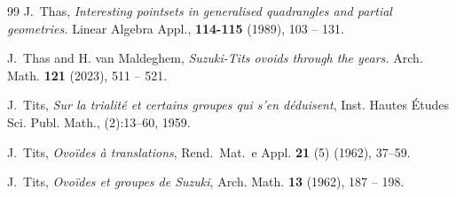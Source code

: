 \documentclass[a4paper,11pt]{amsproc}
\theoremstyle{plain}
\theoremstyle{definition}
\newcommand{\<}{\langle}
\renewcommand{\>}{\rangle} %
\begin{document}
\begin{thebibliography}{99}
J.~Thas,
{\it Interesting pointsets in generalised quadrangles and partial
  geometries.}
Linear Algebra Appl., {\bf 114-115} (1989), 103 -- 131.

J.~Thas and H. van Maldeghem,
{\it Suzuki-Tits ovoids through the years.}
Arch. Math. {\bf 121} (2023), 511 -- 521.

J.~Tits,
{\it Sur la trialit{\'e} et certains groupes qui s'en d{\'e}duisent},
Inst. Hautes {\'E}tudes Sci. Publ. Math., (2):13--60, 1959.

J.~Tits,
{\it Ovo\"ides \`a translations}, 
Rend.~Mat.~e Appl. {\bf 21} (5) (1962), 37--59.

J.~Tits,
{\it Ovo\"ides et groupes de {S}uzuki}, 
Arch. Math. {\bf 13} (1962), 187 -- 198.

\end{thebibliography}
\end{document}
